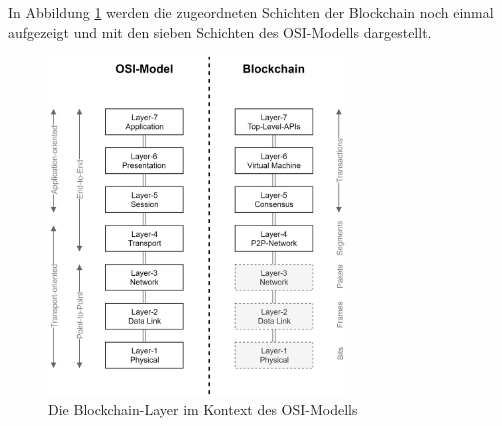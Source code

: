 In Abbildung \ref{fig:chapter02:osi_blockchain} werden die zugeordneten Schichten der Blockchain noch einmal aufgezeigt und mit den sieben Schichten des \ac{OSI}-Modells dargestellt.

\begin{figure}[h]
 \centering
 \includegraphics[width=0.7\textwidth]{gfx/osi_blockchain.png}
 \caption{Die Blockchain-Layer im Kontext des OSI-Modells}
 \label{fig:chapter02:osi_blockchain}
\end{figure}

